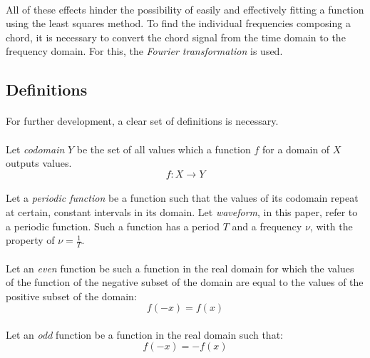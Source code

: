 \documentclass{article}
\begin{document}
\paragraph*{}
All of these effects hinder the possibility of easily and effectively fitting 
a function using the least squares method. To find the individual frequencies 
composing a chord, it is necessary to convert the chord signal from the time 
domain to the frequency domain. For this, the \textit{Fourier transformation} 
is used.

\subsection{Definitions}

\paragraph*{}
For further development, a clear set of definitions is necessary.

\paragraph*{}
Let \textit{codomain} $Y$ be the set of all values which a function $f$ for a 
domain of $X$ outputs values.
$$f: X \rightarrow Y$$

\paragraph*{}
Let a \textit{periodic function} be a function such that the values of its
codomain repeat at certain, constant intervals in its domain. Let
\textit{waveform}, in this paper, refer to a periodic function. Such a function
has a period $T$ and a frequency $\nu$, with the property of $\nu =
\frac{1}{T}$.

\paragraph*{}
Let an \textit{even} function be such a function in the real domain for which
the values of the function of the negative subset of the domain are equal to
the values of the positive subset of the domain:
$$f(-x) = f(x)$$

\paragraph*{}
Let an \textit{odd} function be a function in the real domain such that:
$$f(-x) = -f(x)$$
\end{document}
